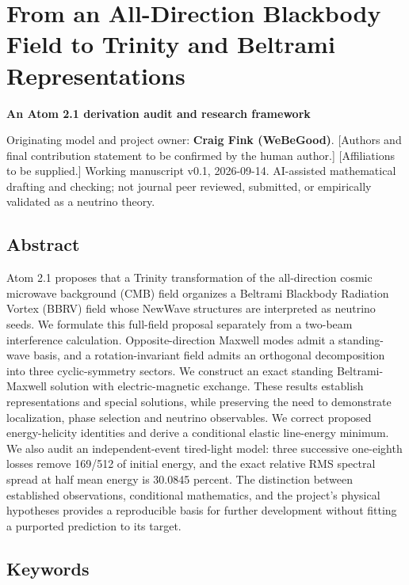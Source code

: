 \documentclass[
  11pt,
]{article}
\author{}
\date{}
\begin{document}
\hypertarget{from-an-all-direction-blackbody-field-to-trinity-and-beltrami-representations}{%
\section{From an All-Direction Blackbody Field to Trinity and Beltrami
Representations}\label{from-an-all-direction-blackbody-field-to-trinity-and-beltrami-representations}}

\textbf{An Atom 2.1 derivation audit and research framework}

Originating model and project owner: \textbf{Craig Fink (WeBeGood)}.
{[}Authors and final contribution statement to be confirmed by the human
author.{]} {[}Affiliations to be supplied.{]} Working manuscript v0.1,
2026-09-14. AI-assisted mathematical drafting and checking; not journal
peer reviewed, submitted, or empirically validated as a neutrino theory.

\hypertarget{abstract}{%
\subsection{Abstract}\label{abstract}}

Atom 2.1 proposes that a Trinity transformation of the all-direction
cosmic microwave background (CMB) field organizes a Beltrami Blackbody
Radiation Vortex (BBRV) field whose NewWave structures are interpreted
as neutrino seeds. We formulate this full-field proposal separately from
a two-beam interference calculation. Opposite-direction Maxwell modes
admit a standing-wave basis, and a rotation-invariant field admits an
orthogonal decomposition into three cyclic-symmetry sectors. We
construct an exact standing Beltrami-Maxwell solution with
electric-magnetic exchange. These results establish representations and
special solutions, while preserving the need to demonstrate
localization, phase selection and neutrino observables. We correct
proposed energy-helicity identities and derive a conditional elastic
line-energy minimum. We also audit an independent-event tired-light
model: three successive one-eighth losses remove 169/512 of initial
energy, and the exact relative RMS spectral spread at half mean energy
is 30.0845 percent. The distinction between established observations,
conditional mathematics, and the project's physical hypotheses provides
a reproducible basis for further development without fitting a purported
prediction to its target.

\hypertarget{keywords}{%
\subsection{Keywords}\label{keywords}}
\end{document}
